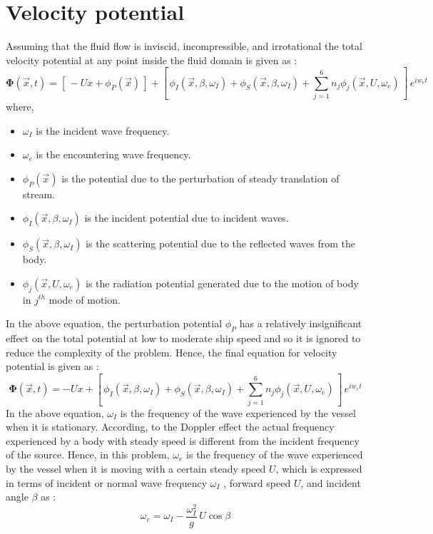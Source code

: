 \section{Velocity potential}
Assuming that the fluid flow is inviscid, incompressible, and irrotational the total velocity potential at any point inside the fluid domain is given as :
\begin{equation}
    \boldsymbol{\Phi} (\vec{x}, t) = [\, -Ux + \phi_P(\vec{x})\,] + [\, \phi_I(\vec{x}, \beta, \omega_I) + \phi_S(\vec{x}, \beta, \omega_I) + \sum_{j=1}^{6}n_j\phi_j(\vec{x}, U, \omega_e) \,]\, e^{i w_e t}
\end{equation}
where, 
\begin{itemize}
    \item $\omega_I$ is the incident wave frequency.
    \item $\omega_e$ is the encountering wave frequency.
    \item $\phi_P(\vec{x})$ is the potential due to the perturbation of steady translation of stream.
    \item $\phi_I(\vec{x}, \beta, \omega_I)$ is the incident potential due to incident waves.
    \item $\phi_S(\vec{x}, \beta, \omega_I)$ is the scattering potential due to the reflected 
    waves from the body.
    \item $\phi_j(\vec{x}, U, \omega_e)$ is the radiation potential generated due to the
    motion of body in $j^{th}$ mode of motion.
\end{itemize}
In the above equation, the perturbation potential $\phi_P$ has a relatively insignificant 
effect on the total 
potential at low to moderate ship speed and so it is ignored to reduce the complexity 
of the problem. Hence, the final equation for velocity potential is given as :
\begin{equation}
    \label{eq:velocity_potential}
    \boldsymbol{\Phi} (\vec{x}, t) = -Ux + [\, \phi_I(\vec{x}, \beta, \omega_I) + \phi_S(\vec{x}, 
    \beta, \omega_I) + \sum_{j=1}^{6}n_j\phi_j(\vec{x}, U, \omega_e) \,]\, e^{i w_e t}
\end{equation}
In the above equation, $\omega_I$ is the 
frequency of the wave experienced by the vessel when it is stationary. According,
to the Doppler effect the actual frequency experienced by a body with steady speed is different 
from the incident frequency of the source. Hence, in this problem, $\omega_e$ is the frequency of 
the wave experienced by the vessel when it is moving with a 
certain steady speed $U$, which is expressed in terms of incident or normal wave 
frequency $\omega_I$ , forward speed $U$, and incident angle $\beta$ as :
\begin{equation}
    \label{eq:omega}
    \omega_e = \omega_I - \frac{\omega_I^2}{g}\,U\cos\beta
\end{equation}

